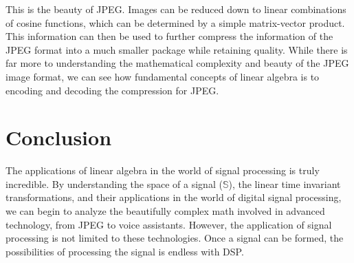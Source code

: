 \documentclass[11pt]{article}
\begin{document}
This is the beauty of JPEG. Images can be reduced down to linear combinations of cosine functions, which can be determined by a simple matrix-vector product. This information can then be used to further compress the information of the JPEG format into a much smaller package while retaining quality. While there is far more to understanding the mathematical complexity and beauty of the JPEG image format, we can see how fundamental concepts of linear algebra is to encoding and decoding the compression for JPEG.

\section{Conclusion}

The applications of linear algebra in the world of signal processing is truly incredible. By understanding the space of a signal ($\mathbb{S}$), the linear time invariant transformations, and their applications in the world of digital signal processing, we can begin to analyze the beautifully complex math involved in advanced technology, from JPEG to voice assistants. However, the application of signal processing is not limited to these technologies. Once a signal can be formed, the possibilities of processing the signal is endless with DSP.





\end{document}
